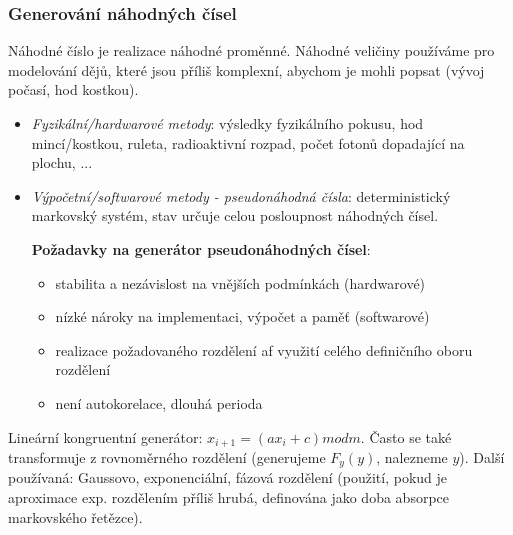 \subsubsection*{Generování náhodných čísel}
Náhodné číslo je realizace náhodné proměnné. Náhodné veličiny používáme pro modelování dějů, které jsou příliš komplexní, abychom je mohli popsat (vývoj počasí, hod kostkou).
\begin{itemize}
\item \textit{Fyzikální/hardwarové metody}: výsledky fyzikálního pokusu, hod mincí/kostkou, ruleta, radioaktivní rozpad, počet fotonů dopadající na plochu, ...
\item \textit{Výpočetní/softwarové metody - pseudonáhodná čísla}: deterministický markovský systém, stav určuje celou posloupnost náhodných čísel.

\textbf{Požadavky na generátor pseudonáhodných čísel}:
\begin{itemize}
\item stabilita a nezávislost na vnějších podmínkách (hardwarové)
\item nízké nároky na implementaci, výpočet a paměť (softwarové)
\item realizace požadovaného rozdělení af využití celého definičního oboru rozdělení
\item není autokorelace, dlouhá perioda
\end{itemize}
\end{itemize}
Lineární kongruentní generátor: $ x_{i+1} = (ax_i + c) mod m $. Často se také transformuje z rovnoměrného rozdělení (generujeme $ F_y(y) $, nalezneme $ y $). Další používaná: Gaussovo, exponenciální, fázová rozdělení (použití, pokud je aproximace exp. rozdělením příliš hrubá, definována jako doba absorpce markovského řetězce).


